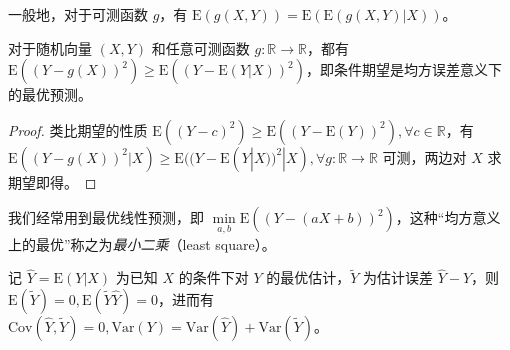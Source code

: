 \documentclass[../main.tex]{subfiles}
\begin{document}
一般地，对于可测函数 $g$，有 $\mathrm E(g(X,Y))=\mathrm E(\mathrm E(g(X,Y)|X))$。

\begin{theorem}\label{thm:4.7.2}
    对于随机向量 $(X,Y)$ 和任意可测函数 $g:\mathbb R\rightarrow\mathbb R$，都有 $\mathrm E((Y-g(X))^2)\geq \mathrm E((Y-\mathrm E(Y|X))^2)$，即条件期望是均方误差意义下的最优预测。
\end{theorem}

\begin{proof}
    类比期望的性质 $\mathrm E((Y-c)^2)\geq\mathrm E((Y-\mathrm E(Y))^2),\forall c\in\mathbb R$，有 $\mathrm E((Y-g(X))^2|X)\geq\mathrm E((Y-\mathrm E(Y|X))^2|X),\forall g:\mathbb R\rightarrow\mathbb R$ 可测，两边对 $X$ 求期望即得。
\end{proof}

我们经常用到最优线性预测，即 $\min\limits_{a,b}\mathrm E((Y-(aX+b))^2)$，这种“均方意义上的最优”称之为\emph{最小二乘}（least square）。

\begin{proposition}
    记 $\hat Y=\mathrm E(Y|X)$ 为已知 $X$ 的条件下对 $Y$ 的最优估计，$\tilde Y$ 为估计误差 $\hat Y-Y$，则 $\mathrm E(\tilde Y)=0,\mathrm E(\tilde Y\hat Y)=0$，进而有 $\mathrm{Cov}(\hat Y,\tilde Y)=0,\mathrm{Var}(Y)=\mathrm{Var}(\hat Y)+\mathrm{Var}(\tilde Y)$。
\end{proposition}
\end{document}
